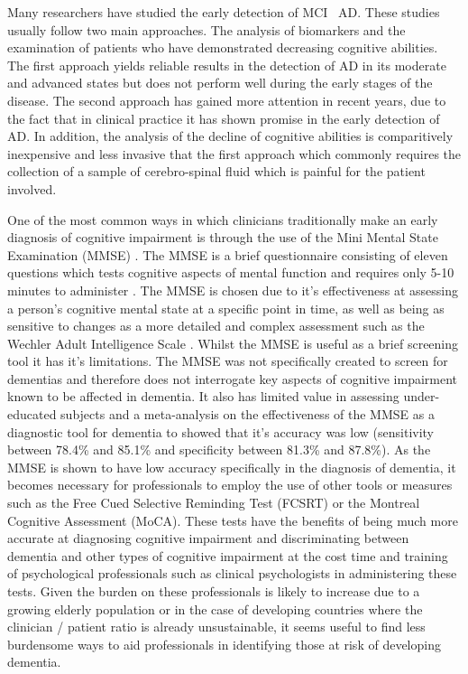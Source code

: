 \documentclass{article}
\begin{document}
\par 
Many researchers have studied the early detection of MCI \ AD. These studies usually follow two main approaches. The analysis of biomarkers and the examination of patients who have demonstrated decreasing cognitive abilities. The first approach yields reliable results in the detection of AD in its moderate and advanced states but does not perform well during the early stages of the disease. The second approach has gained more attention in recent years, due to the fact that in clinical practice it has shown promise in the early detection of AD. In addition, the analysis of the decline of cognitive abilities is comparitively inexpensive and less invasive that the first approach which commonly requires the collection of a sample of cerebro-spinal fluid which is painful for the patient involved. 
\par
One of the most common ways in which clinicians traditionally make an early diagnosis of cognitive impairment is through the use of the Mini Mental State Examination (MMSE) \cite{Folstein1975}. The MMSE is a brief questionnaire consisting of eleven questions which tests cognitive aspects of mental function and requires only 5-10 minutes to administer \cite{Folstein1975}. The MMSE is chosen due to it's effectiveness at assessing a person's cognitive mental state at a specific point in time, as well as being as sensitive to changes as a more detailed and complex assessment such as the Wechler Adult Intelligence Scale \cite{Folstein1975}. Whilst the MMSE is useful as a brief screening tool it has it's limitations. The MMSE was not specifically created to screen for dementias and therefore does not interrogate key aspects of cognitive impairment known to be affected in dementia. It also has limited value in assessing under-educated subjects and a meta-analysis on the effectiveness of the MMSE as a diagnostic tool for dementia to showed that it's accuracy was low (sensitivity between 78.4\% and 85.1\% and specificity between 81.3\% and 87.8\%). As the MMSE is shown to have low accuracy specifically in the diagnosis of dementia, it becomes necessary for professionals to employ the use of other tools or measures such as the Free Cued Selective Reminding Test (FCSRT) or the Montreal Cognitive Assessment (MoCA). These tests have the benefits of being much more accurate at diagnosing cognitive impairment and discriminating between dementia and other types of cognitive impairment at the cost time and training of psychological professionals such as clinical psychologists in administering these tests. Given the burden on these professionals is likely to increase due to a growing elderly population or in the case of developing countries where the clinician / patient ratio is already unsustainable, it seems useful to find less burdensome ways to aid professionals in identifying those at risk of developing dementia.
\end{document}
